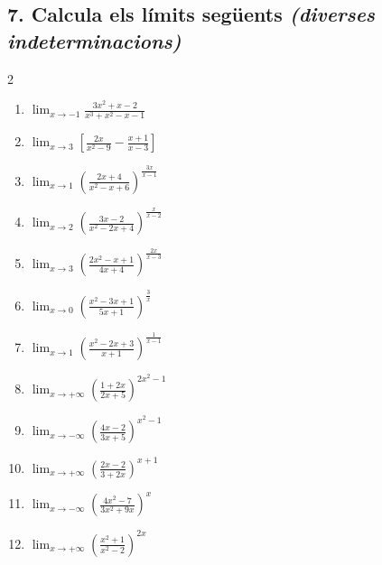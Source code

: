 \documentclass[12pt,a4paper]{article}
\begin{document}
\subsection*{7. Calcula els límits següents \emph{(diverses indeterminacions)}}
\begin{multicols}{2}
\begin{enumerate}[label=7.\arabic*.]
    \item $\displaystyle \lim_{x \to -1}
          \frac{3x^2+x-2}{x^3+x^2-x-1}$
          

    \item $\displaystyle \lim_{x \to 3}
          \left[\frac{2x}{x^2-9}-\frac{x+1}{x-3}\right]$
          

    \item $\displaystyle \lim_{x \to 1}
          \left(\frac{2x+4}{x^2-x+6}\right)^{\!\frac{3x}{x-1}}$
          

    \item $\displaystyle \lim_{x \to 2}
          \left(\frac{3x-2}{x^2-2x+4}\right)^{\!\frac{x}{x-2}}$
          

    \item $\displaystyle \lim_{x \to 3}
          \left(\frac{2x^2-x+1}{4x+4}\right)^{\!\frac{2x}{x-3}}$
          

    \item $\displaystyle \lim_{x \to 0}
          \left(\frac{x^2-3x+1}{5x+1}\right)^{\!\frac{3}{x}}$
          

    \item $\displaystyle \lim_{x \to 1}
          \left(\frac{x^2-2x+3}{x+1}\right)^{\!\frac{1}{x-1}}$
          

    \item $\displaystyle \lim_{x \to +\infty}
          \left(\frac{1+2x}{2x+5}\right)^{\!2x^2-1}$
          

    \item $\displaystyle \lim_{x \to -\infty}
          \left(\frac{4x-2}{3x+5}\right)^{\!x^2-1}$
          

    \item $\displaystyle \lim_{x \to +\infty}
          \left(\frac{2x-2}{3+2x}\right)^{\!x+1}$
          

    \item $\displaystyle \lim_{x \to -\infty}
          \left(\frac{4x^2-7}{3x^2+9x}\right)^{\!x}$
          

    \item $\displaystyle \lim_{x \to +\infty}
          \left(\frac{x^2+1}{x^2-2}\right)^{\!2x}$
          


\end{enumerate}
\end{multicols}
\end{document}
